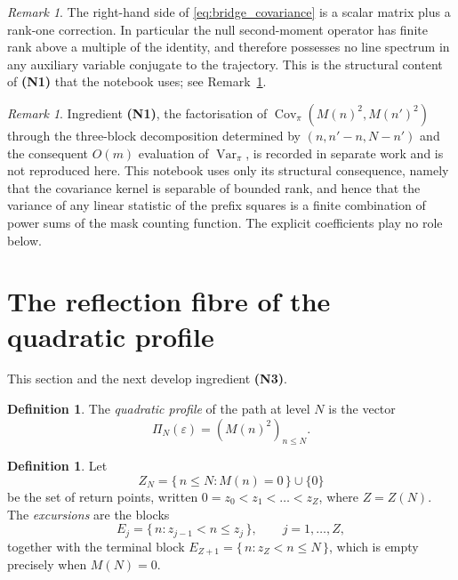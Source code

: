 \documentclass[11pt]{amsart}
\numberwithin{equation}{section}
\theoremstyle{plain}
\theoremstyle{definition}
\newtheorem{definition}[theorem]{Definition}
\theoremstyle{remark}
\newtheorem{remark}[theorem]{Remark}
\DeclareMathOperator{\Var}{Var}
\DeclareMathOperator{\Cov}{Cov}
\begin{document}
\begin{remark}
\label{rem:finite_rank}
The right-hand side of \eqref{eq:bridge_covariance} is a scalar matrix
plus a rank-one correction. In particular the null second-moment
operator has finite rank above a multiple of the identity, and
therefore possesses no line spectrum in any auxiliary variable
conjugate to the trajectory. This is the structural content of
\textbf{(N1)} that the notebook uses; see
Remark~\ref{rem:N1_usage}.
\end{remark}

\begin{remark}
\label{rem:N1_usage}
Ingredient \textbf{(N1)}, the factorisation of
$\Cov_\pi\!\left(M(n)^2, M(n')^2\right)$ through the three-block
decomposition determined by $(n, n'-n, N-n')$ and the consequent $O(m)$
evaluation of $\Var_\pi$, is recorded in separate work and is not
reproduced here. This notebook uses only its structural consequence,
namely that the covariance kernel is separable of bounded rank, and
hence that the variance of any linear statistic of the prefix squares
is a finite combination of power sums of the mask counting function.
The explicit coefficients play no role below.
\end{remark}

\section{The reflection fibre of the quadratic profile}
\label{sec:reflection_fibre}

This section and the next develop ingredient \textbf{(N3)}.

\begin{definition}
\label{def:quadratic_profile}
The \emph{quadratic profile} of the path at level $N$ is the vector
\begin{equation}
\Pi_N(\varepsilon) = \left( M(n)^2 \right)_{n \le N}.
\label{eq:quadratic_profile}
\end{equation}
\end{definition}

\begin{definition}
\label{def:excursions}
Let
\begin{equation}
Z_N = \{\, n \le N : M(n) = 0 \,\} \cup \{0\}
\label{eq:zero_set}
\end{equation}
be the set of return points, written
$0 = z_0 < z_1 < \dots < z_{Z}$, where $Z = Z(N)$. The
\emph{excursions} are the blocks
\begin{equation}
E_j = \{\, n : z_{j-1} < n \le z_j \,\},
\qquad j = 1, \dots, Z,
\label{eq:excursion_blocks}
\end{equation}
together with the terminal block
$E_{Z+1} = \{\, n : z_{Z} < n \le N \,\}$, which is empty precisely
when $M(N) = 0$.
\end{definition}
\end{document}
